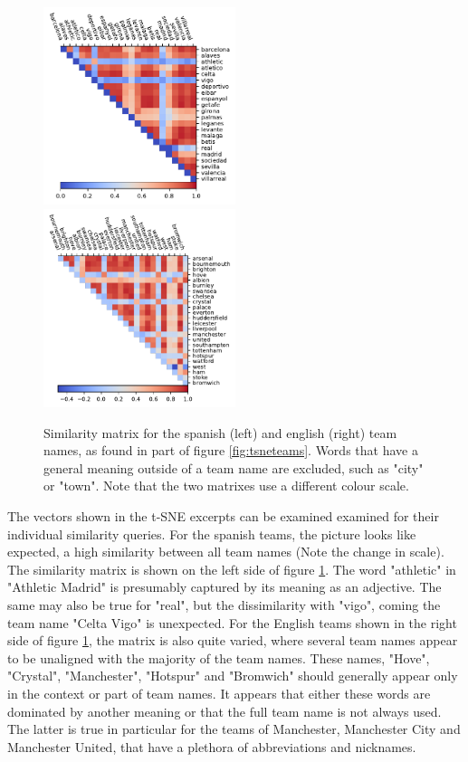 \documentclass[10pt, a4paper]{UUThesisTemplate}
\begin{document}
\begin{figure}[hbt]
\includegraphics[width=0.5\textwidth]{figures/simmat_spanish_teams.pdf}
\includegraphics[width=0.5\textwidth]{figures/simmat_english_teams.pdf}
\caption{Similarity matrix for the spanish (left) and english (right) team names, as found in part of figure \ref{fig:tsneteams}. Words that have a general meaning outside of a team name are excluded, such as "city" or "town". Note that the two matrixes use a different colour scale.}\label{fig:simmatrixspain}
\end{figure}

The vectors shown in the t-SNE excerpts can be examined examined for their individual similarity queries. For the spanish teams, the picture looks like expected, a high similarity between all team names (Note the change in scale). The similarity matrix is shown on the left side of figure \ref{fig:simmatrixspain}. The word "athletic" in "Athletic Madrid" is presumably captured by its meaning as an adjective. The same may also be true for "real", but the dissimilarity with "vigo", coming the team name "Celta Vigo" is unexpected. For the English teams shown in the right side of figure \ref{fig:simmatrixspain}, the matrix is also quite varied, where several team names appear to be unaligned with the majority of the team names. These names, "Hove", "Crystal", "Manchester", "Hotspur" and "Bromwich" should generally appear only in the context or part of team names. It appears that either these words are dominated by another meaning or that the full team name is not always used. The latter is true in particular for the teams of Manchester, Manchester City and Manchester United, that have a plethora of abbreviations and nicknames.
\end{document}
